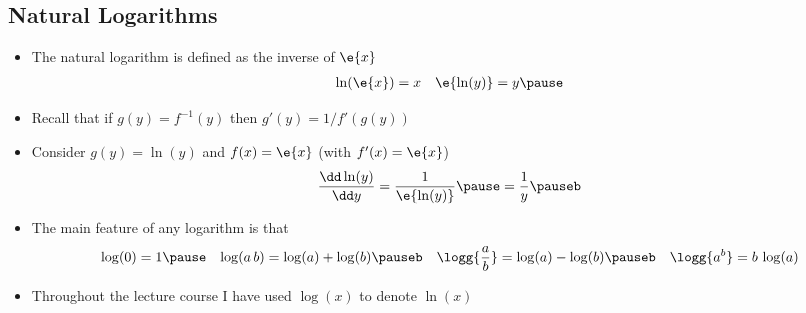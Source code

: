 \begin{slide}
\section{Natural Logarithms}

\begin{PauseHighLight}
  \begin{itemize}
  \item The natural logarithm is defined as the inverse of $\e{x}$
    \begin{align*}
      \ln(\e{x}) &= x  & \e{\ln(y)} =y\pause
    \end{align*}
  \item Recall that if $g(y)= f^{-1}(y)$ then $g'(y) =
    1/f'(g(y))$\pause
  \item Consider $g(y)=\ln(y)$ and $f(x)= \e{x}$ (with $f'(x)=\e{x}$)
    \begin{align*}
      \frac{\dd \ln(y)}{\dd y} = \frac{1}{\e{\ln(y)}}\pause = \frac{1}{y}\pauseb
    \end{align*}
  \item The main feature of any logarithm is that
    \begin{align*}
      \log(0) &= 1 \pause
      &
        \log(a\,b) &= \log(a) + \log(b) \pauseb
      &
        \logg{\frac{a}{b}}&= \log(a) -\log(b) \pauseb
      &
        \logg{a^b} = b\, \log(a)
    \end{align*}
  \item Throughout the lecture course I have used $\log(x)$ to denote
    $\ln(x)$\pause
  \end{itemize}
\end{PauseHighLight}

\end{slide}



